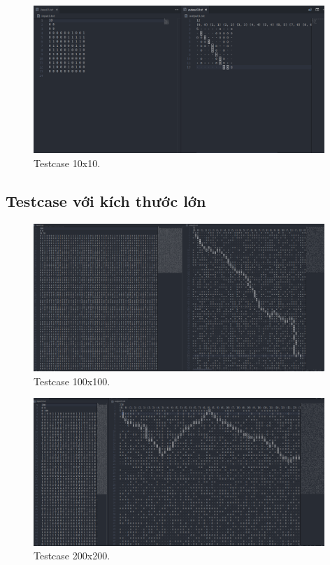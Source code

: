 \begin{figure}[H]
\centering
\includegraphics[width=0.98\textwidth]{t3.png}
\caption{Testcase 10x10.}
\end{figure}

\subsection{Testcase với kích thước lớn}

\begin{figure}[H]
\centering
\includegraphics[width=0.98\textwidth]{t4.png}
\caption{Testcase 100x100.}
\end{figure}

\begin{figure}[H]
\centering
\includegraphics[width=0.98\textwidth]{t5.png}
\caption{Testcase 200x200.}
\end{figure}

